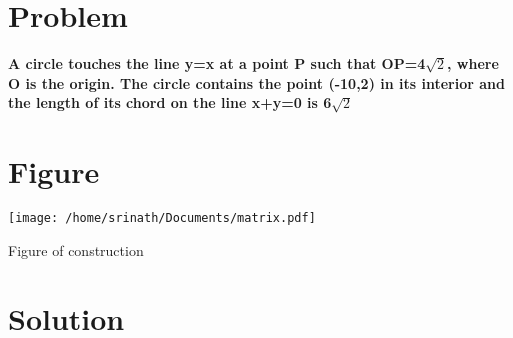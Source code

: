 \documentclass[10pt, a4paper]{article}
\title{\mytitle}
\author{\myauthor\hspace{1em}\\\contact\\FWC22038\hspace{6.5em}IITH\hspace{0.5em}\mymodule\hspace{6em}Assignment}
\begin{document}
\maketitle
\tableofcontents
\section{Problem}
\textbf{A circle touches the line y=x at a point P such that OP=4$\sqrt{2}$, where O is the origin. The circle contains the point (-10,2) in its interior and the length of its chord on the line x+y=0 is 6$\sqrt{2}$}
 
\section{Figure}
  \texttt{[image: /home/srinath/Documents/matrix.pdf]} 
  	\begin{center}
  Figure of construction
  	\end{center}
\section{Solution}
\end{document}
